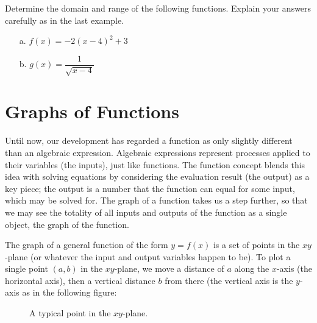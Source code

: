 \begin{question} Determine the domain and range of the following functions. Explain your answers carefully as in the last example.
\begin{enumerate}
\item[a.] $f(x) = -2(x-4)^2+3$
\item[b.] $g(x) = \dfrac{1}{\sqrt{x-4}}$
\end{enumerate}
\end{question}     



\section{Graphs of Functions}

Until now, our development has regarded a function as only slightly different than an algebraic expression. Algebraic expressions represent processes applied to their variables (the inputs), just like functions. The function concept blends this idea with solving equations by considering the evaluation result (the output) as a key piece; the output is a number that the function can equal for some input, which may be solved for. The graph of a function takes us a step further, so that we may see the totality of all inputs and outputs of the function as a single object, the graph of the function.

\par

The graph of a general function of the form $y = f(x)$ is a set of points in the $xy$-plane (or whatever the input and output variables happen to be). To plot a single point $(a,b)$ in the $xy$-plane, we move a distance of $a$ along the $x$-axis (the horizontal axis), then a vertical distance $b$ from there (the vertical axis is the $y$-axis as in the following figure:

\begin{figure}[h]
\centering
{} 
\caption{A typical point in the $xy$-plane.}
\end{figure}

